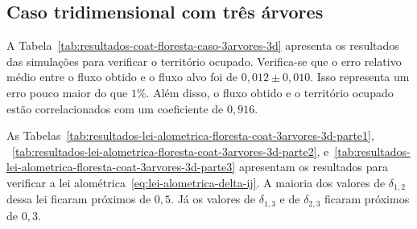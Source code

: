 \begin{figure}[!htb]

  \label{fig:floresta-peso-do-territorio}
\end{figure}

\subsection{Caso tridimensional com três árvores}\label{sec:coat-floresta-caso-3arvores-3d}

A Tabela~\ref{tab:resultados-coat-floresta-caso-3arvores-3d} apresenta
os resultados das simulações para verificar o território ocupado.
Verifica-se que o erro relativo médio entre o fluxo obtido e o fluxo alvo foi 
de $0,012 \pm 0,010$. Isso representa um erro pouco maior do que $1\%$. 
Além disso, o fluxo obtido e o território ocupado estão correlacionados com um
coeficiente de $0,916$.

As Tabelas~\ref{tab:resultados-lei-alometrica-floresta-coat-3arvores-3d-parte1}, 
~\ref{tab:resultados-lei-alometrica-floresta-coat-3arvores-3d-parte2}, 
e~\ref{tab:resultados-lei-alometrica-floresta-coat-3arvores-3d-parte3} apresentam os resultados 
para verificar a lei alométrica~\eqref{eq:lei-alometrica-delta-ij}.
A maioria dos valores de $\delta_{1, 2}$ dessa lei ficaram próximos de $0,5$.
Já os valores de $\delta_{1, 3}$ e de $\delta_{2, 3}$ ficaram próximos de $0,3$.


